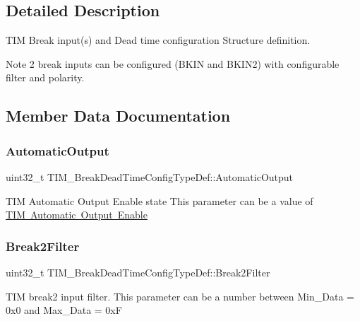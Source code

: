 \subsection{Detailed Description}
T\+IM Break input(s) and Dead time configuration Structure definition. 

\begin{DoxyNote}{Note}
2 break inputs can be configured (B\+K\+IN and B\+K\+I\+N2) with configurable filter and polarity. 
\end{DoxyNote}


\subsection{Member Data Documentation}
\mbox{\label{struct_t_i_m___break_dead_time_config_type_def_ae591f2368d0be5b77d8a746e73eabe71}} 
\subsubsection{\texorpdfstring{AutomaticOutput}{AutomaticOutput}}
{\footnotesize\ttfamily uint32\+\_\+t T\+I\+M\+\_\+\+Break\+Dead\+Time\+Config\+Type\+Def\+::\+Automatic\+Output}

T\+IM Automatic Output Enable state This parameter can be a value of \mbox{\hyperlink{group___t_i_m___a_o_e___bit___set___reset}{T\+IM Automatic Output Enable}} \mbox{\label{struct_t_i_m___break_dead_time_config_type_def_a3c90aabc31a34864525dad4bd3547c86}} 
\subsubsection{\texorpdfstring{Break2Filter}{Break2Filter}}
{\footnotesize\ttfamily uint32\+\_\+t T\+I\+M\+\_\+\+Break\+Dead\+Time\+Config\+Type\+Def\+::\+Break2\+Filter}

T\+IM break2 input filter. This parameter can be a number between Min\+\_\+\+Data = 0x0 and Max\+\_\+\+Data = 0xF \mbox{\label{struct_t_i_m___break_dead_time_config_type_def_af492d4b9f5e974abb51abe58d413cd17}} 
